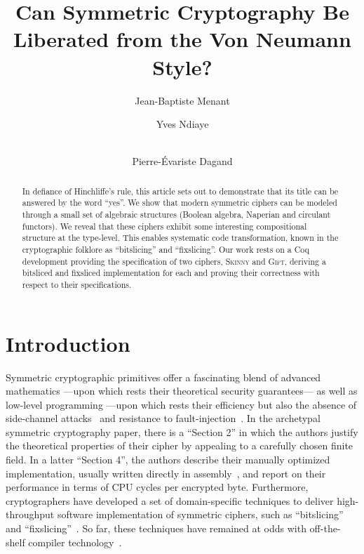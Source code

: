 \documentclass[draft,english]{jflart}
\title{Can Symmetric Cryptography Be Liberated from the Von Neumann
  Style?}
\author[1]{Jean-Baptiste Menant}
\author[2]{Yves Ndiaye}
\author[2,3]{\\Pierre-Évariste Dagand}
\affil[1]{École Normale Supérieure de Lyon}
\affil[2]{Université Paris Cité, IRIF}
\affil[3]{CNRS}
\newcommand{\Skinny}{\textsc{Skinny}}
\newcommand{\Gift}{\textsc{Gift}}
\begin{document}
\maketitle

\begin{abstract}

  In defiance of Hinchliffe's rule, this article sets out to
  demonstrate that its title can be answered by the word ``yes''. We
  show that modern symmetric ciphers can be modeled through a small
  set of algebraic structures (Boolean algebra, Naperian and circulant
  functors). We reveal that these ciphers exhibit some interesting
  compositional structure at the type-level. This enables systematic
  code transformation, known in the cryptographic folklore as
  ``bitslicing'' and ``fixslicing''. Our work rests on a Coq
  development providing the specification of two ciphers, \Skinny{} and
  \Gift{}, deriving a bitsliced and fixsliced implementation for each and
  proving their correctness with respect to their specifications.

\end{abstract}

\section{Introduction}


Symmetric cryptographic primitives offer a fascinating blend of
advanced mathematics ---upon which rests their theoretical security
guarantees--- as well as low-level programming ---upon which rests
their efficiency but also the absence of side-channel
attacks~\citep{leroy:side-channel} and resistance to
fault-injection~\citep{heydemann:fault-attack}.
%
In the archetypal symmetric cryptography paper, there is a ``Section
2'' in which the authors justify the theoretical properties of their
cipher by appealing to a carefully chosen finite field. In a latter
``Section 4'', the authors describe their manually optimized
implementation, usually written directly in
assembly~\citep{almeida:jasmin}, and report on their performance in
terms of CPU cycles per encrypted byte.
%
Furthermore, cryptographers have developed a set of domain-specific
techniques to deliver high-throughput software implementation of
symmetric ciphers, such as ``bitslicing''~\citep{biham:DES} and
``fixslicing''~\citep{adominicai:fixslicing-gift,
  adomnicai:fixslicing-AES-like}. So far, these techniques have
remained at odds with off-the-shelf compiler
technology~\citep{bernstein:death-compiler,venkatesh:compiler-security}.
\end{document}
